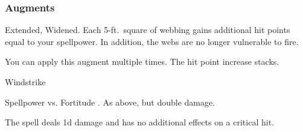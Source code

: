 \subsubsection{Augments}
 Extended, Widened.
Each 5-ft.\ square of webbing gains additional hit points equal to your spellpower.
In addition, the webs are no longer vulnerable to fire.
\par You can apply this augment multiple times.
The hit point increase stacks.
\begin{spellsection}{Windstrike}
\begin{spellheader}
\end{spellheader}
\begin{spellcontent}
\begin{spelltargetinginfo}
\end{spelltargetinginfo}
\begin{spelleffects}
\begin{spellattack}{Spellpower vs. Fortitude}
\spellsuccess {}.
\spellcritical As above, but double damage.
\end{spellattack}
\end{spelleffects}
\end{spellcontent}
\begin{spellfooter}
\miscastexplode
\end{spellfooter}
\begin{spellcantrip}
The spell deals \minus1d damage and has no additional effects on a critical hit.
\end{spellcantrip}
\end{spellsection}
